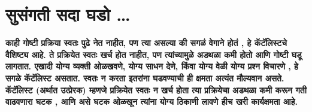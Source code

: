 \chapter{सुसंगती सदा घडो … }

\textcolor{blue!60!black}{\textbf{काही गोष्टी प्रक्रिया स्वतः पुढे नेत नाहीत, पण त्या असल्या की सगळं वेगाने होतं , हे कॅटॅलिस्टचे वैशिष्ट्य आहे. ते प्रक्रियेत स्वतः खर्च होत नाहीत, पण त्यांच्यामुळे अडथळा कमी होतो आणि गोष्टी घडू लागतात. एखादी योग्य व्यक्ती ओळखवणे, योग्य साधन देणे, किंवा योग्य वेळी योग्य प्रश्न विचारणे , हे सगळे कॅटॅलिस्ट असतात. स्वतः न करता इतरांना घडवण्याची ही क्षमता अत्यंत मौल्यवान असते. कॅटॅलिस्ट (अर्थात उत्प्रेरक) म्हणजे प्रक्रियेत स्वतः न खर्च होता त्या प्रक्रियेचा अडथळा कमी करून गती वाढवणारा घटक , आणि असे घटक ओळखून त्यांना योग्य ठिकाणी लावणे हीच खरी कार्यक्षमता आहे.}}

